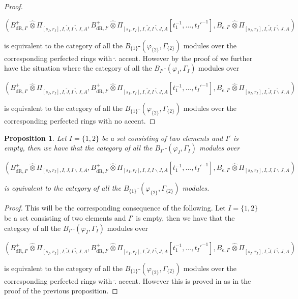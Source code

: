 \documentclass[12pt]{amsart}
\newtheorem{proposition}[theorem]{Proposition}
\theoremstyle{definition}
\numberwithin{equation}{section}
\begin{document}
\begin{proof}
\begin{center}
$(B^+_{\mathrm{dR},I'}	\widehat{\otimes}\Pi_{[s_I,r_I],I,\widetilde{J},\widetilde{I\backslash J},A},B^+_{\mathrm{dR},I'}	\widehat{\otimes}\Pi_{[s_I,r_I],I,\widetilde{J},\widetilde{I\backslash J},A}[t_1^{-1},...,t_I'^{-1}],B_{e,I'}	\widehat{\otimes}\Pi_{[s_I,r_I],I,\widetilde{J},\widetilde{I\backslash J},A})$	
\end{center}
is equivalent to the category of all the $B_{\{1\}}$-$(\varphi_{\{2\}},\Gamma_{\{2\}})$ modules over the corresponding perfected rings with $\widetilde{.}$ accent. However by the proof of \cite[Theorem 4.4]{KP} we further have the situation where the category of all the $B_{I'}$-$(\varphi_I,\Gamma_I)$ modules over 
\begin{center}
$(B^+_{\mathrm{dR},I'}	\widehat{\otimes}\Pi_{[s_I,r_I],I,\widetilde{J},\widetilde{I\backslash J},A},B^+_{\mathrm{dR},I'}	\widehat{\otimes}\Pi_{[s_I,r_I],I,\widetilde{J},\widetilde{I\backslash J},A}[t_1^{-1},...,t_I'^{-1}],B_{e,I'}	\widehat{\otimes}\Pi_{[s_I,r_I],I,\widetilde{J},\widetilde{I\backslash J},A})$	
\end{center}
is equivalent to the category of all the $B_{\{1\}}$-$(\varphi_{\{2\}},\Gamma_{\{2\}})$ modules over the corresponding perfected rings with no accent. 
%
%	
\end{proof}





\begin{proposition}
Let $I=\{1,2\}$ be a set consisting of two elements and $I'$ is empty, then we have that the category of all the $B_{I'}$-$(\varphi_I,\Gamma_I)$ modules over 
\begin{center}
$(B^+_{\mathrm{dR},I'}	\widehat{\otimes}\Pi_{[s_I,r_I],I,J,I\backslash J,A},B^+_{\mathrm{dR},I'}	\widehat{\otimes}\Pi_{[s_I,r_I],I,J,I\backslash J,A}[t_1^{-1},...,t_I'^{-1}],B_{e,I'}	\widehat{\otimes}\Pi_{[s_I,r_I],I,J,I\backslash J,A})$	
\end{center}
is equivalent to the category of all the $B_{\{1\}}$-$(\varphi_{\{2\}},\Gamma_{\{2\}})$ modules.

\end{proposition}


\begin{proof}
This will be the corresponding consequence of the following. Let $I=\{1,2\}$ be a set consisting of two elements and $I'$ is empty, then we have that the category of all the $B_{I'}$-$(\varphi_I,\Gamma_I)$ modules over 
\begin{center}
$(B^+_{\mathrm{dR},I'}	\widehat{\otimes}\Pi_{[s_I,r_I],I,\widetilde{J},\widetilde{I\backslash J},A},B^+_{\mathrm{dR},I'}	\widehat{\otimes}\Pi_{[s_I,r_I],I,\widetilde{J},\widetilde{I\backslash J},A}[t_1^{-1},...,t_I'^{-1}],B_{e,I'}	\widehat{\otimes}\Pi_{[s_I,r_I],I,\widetilde{J},\widetilde{I\backslash J},A})$	
\end{center}
is equivalent to the category of all the $B_{\{1\}}$-$(\varphi_{\{2\}},\Gamma_{\{2\}})$ modules over the corresponding perfected rings with $\widetilde{.}$ accent. However this is proved in \cite[Theorem 2.18]{KP} as in the proof of the previous proposition.

	
\end{proof}
\end{document}
